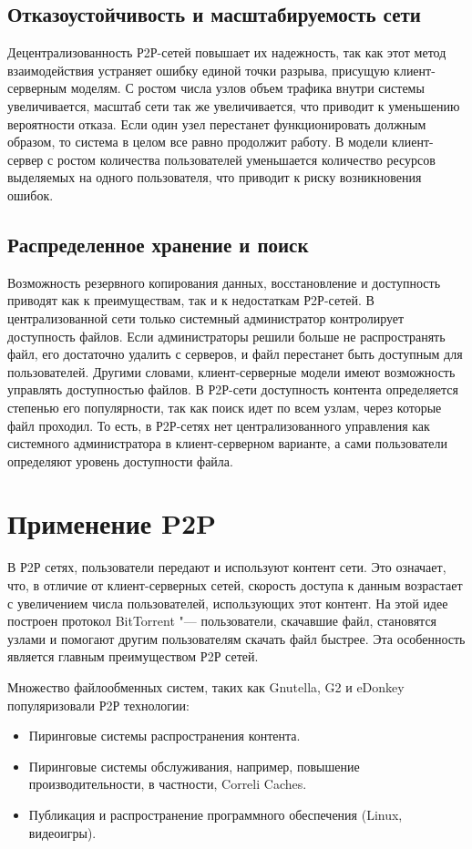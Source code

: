 \documentclass[bachelor, och, coursework]{SCWorks}
\begin{document}
\subsection{Отказоустойчивость и масштабируемость сети}
Децентрализованность Р2Р-сетей повышает их надежность, так как этот метод взаимодействия устраняет ошибку единой точки разрыва, присущую клиент-серверным моделям. С ростом числа узлов объем трафика внутри системы увеличивается, масштаб сети так же увеличивается, что приводит к уменьшению вероятности отказа. Если один узел перестанет функционировать должным образом, то система в целом все равно продолжит работу. 
В модели клиент-сервер с ростом количества пользователей уменьшается количество ресурсов выделяемых на одного пользователя, что приводит к риску возникновения ошибок.

\subsection{Распределенное хранение и поиск}
Возможность резервного копирования данных, восстановление и доступность приводят как к преимуществам, так и к недостаткам Р2Р-сетей. 
В централизованной сети только системный администратор контролирует доступность файлов. 
Если администраторы решили больше не распространять файл, его достаточно удалить с серверов,
и файл перестанет быть доступным для пользователей. Другими словами, клиент-серверные модели имеют возможность управлять доступностью файлов. В Р2Р-сети доступность контента определяется степенью его популярности, так как поиск идет по всем узлам, через которые файл проходил. 
То есть, в Р2Р-сетях нет централизованного управления как системного администратора в клиент-серверном варианте, 
а сами пользователи определяют уровень доступности файла.

\section{Применение P2P}
В Р2Р сетях, пользователи передают и используют контент сети. Это означает, что, в отличие от клиент-серверных сетей, 
скорость доступа к данным возрастает с увеличением числа пользователей, использующих этот контент. 
На этой идее построен протокол BitTorrent "--- пользователи, скачавшие файл, становятся узлами и помогают другим пользователям скачать файл быстрее. 
Эта особенность является главным преимуществом Р2Р сетей.

Множество файлообменных систем, таких как Gnutella, G2 и eDonkey популяризовали Р2Р технологии:
\begin{itemize}
    \item Пиринговые системы распространения контента.
    \item Пиринговые системы обслуживания, например, повышение производительности, в частности, Correli Caches.
    \item Публикация и распространение программного обеспечения (Linux, видеоигры).
\end{itemize}
\end{document}
